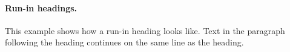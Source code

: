 \documentclass{article}
\begin{document}
  \paragraph{Run-in headings.}
  This example shows how a run-in heading looks like. Text
  in the paragraph following the heading continues on the
  same line as the heading.
\end{document}
